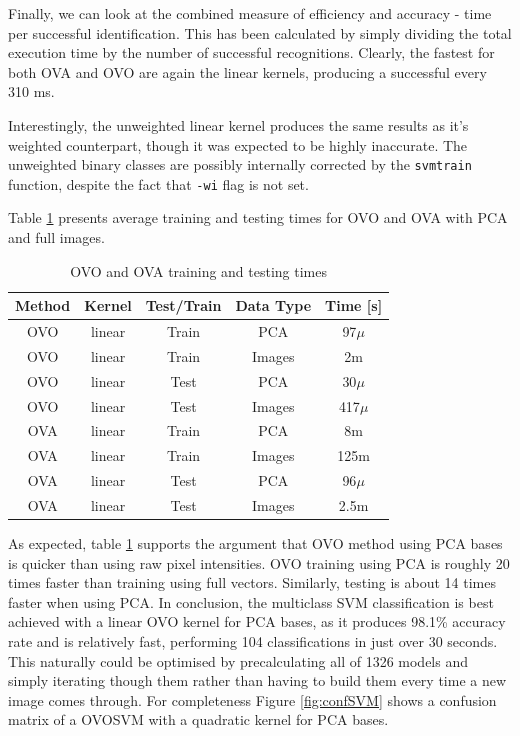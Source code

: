 \documentclass[10pt,twocolumn,letterpaper]{article}
\begin{document}
Finally, we can look at the combined measure of efficiency and accuracy - time per successful identification. This has been calculated by simply dividing the total execution time by the number of successful recognitions. Clearly, the fastest for both OVA and OVO are again the linear kernels, producing a successful every 310 ms. 

Interestingly, the unweighted linear kernel produces the same results as it's weighted counterpart, though it was expected to be highly inaccurate. The unweighted binary classes are possibly internally corrected by the {\tt\small svmtrain} function, despite the fact that {\tt\small -wi} flag is not set.

Table \ref{tab:idvTimes} presents average training and testing times for OVO and OVA with PCA and full images.

\begin{table}[H]
\begin{center}
\caption{OVO and OVA training and testing times}  \label{tab:idvTimes}
\small
\begin{tabular}{||c c c c c||}
\hline
\bf Method & \bf Kernel & \bf Test/Train & \bf Data Type & \bf Time [s]\\ [0.5ex]
\hline \hline
OVO & linear & Train & PCA & 97$\mu$\\ [0.5ex]
\hline
OVO & linear & Train & Images & 2m\\ [0.5ex]
\hline
OVO & linear & Test & PCA & 30$\mu$\\ [0.5ex]
\hline
OVO & linear & Test & Images & 417$\mu$\\ [0.5ex]
\hline \hline
OVA & linear & Train & PCA & 8m\\ [0.5ex]
\hline
OVA & linear & Train & Images & 125m\\ [0.5ex]
\hline
OVA & linear & Test & PCA & 96$\mu$\\ [0.5ex]
\hline
OVA & linear & Test & Images & 2.5m\\ [0.5ex]
\hline
\end{tabular}
\end{center}
\end{table}

As expected, table \ref{tab:idvTimes} supports the argument that OVO method using PCA bases is quicker than using raw pixel intensities. OVO training using PCA is roughly 20 times faster than training using full vectors. Similarly, testing is about 14 times faster when using PCA. In conclusion, the multiclass SVM classification is best achieved with a linear OVO kernel for PCA bases, as it produces 98.1\% accuracy rate and is relatively fast, performing 104 classifications in just over 30 seconds. This naturally could be optimised by precalculating all of 1326 models and simply iterating though them rather than having to build them every time a new image comes through. For completeness Figure \ref{fig:confSVM} shows a confusion matrix of a OVOSVM with a quadratic kernel for PCA bases.
\end{document}
